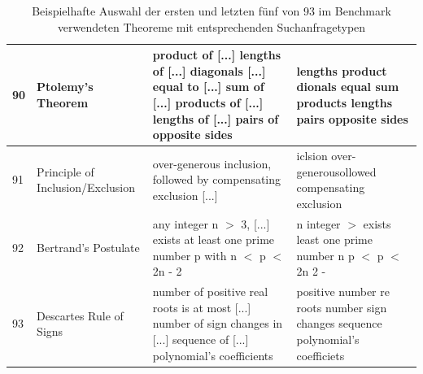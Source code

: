 \documentclass[12pt,letterpaper]{article} %
\begin{document}
\begin{table}[H]
\begin{tabularx}{\textwidth}{l>{\RaggedRight\arraybackslash}X>{\RaggedRight\arraybackslash}X>{\RaggedRight\arraybackslash}X}
\midrule

90 & Ptolemy's Theorem & product of [...] lengths of [...] diagonals [...] equal to [...] sum of [...] products of [...] lengths of [...] pairs of opposite sides\footnotemark[7] & lengths product dionals equal sum products lengths pairs opposite sides \\

\midrule

91 & Principle of Inclusion/Exclusion & [...] over-generous inclusion, followed by compensating exclusion [...]\footnotemark[8] & iclsion over-generousollowed compensating exclusion \\

\midrule

92 & Bertrand's Postulate & [...] any integer n $>$ 3, [...] exists at least one prime number p with n $<$ p $<$ 2n - 2\footnotemark[9] & n integer $>$ exists least one prime number n p $<$ p $<$ 2n 2 - \\

\midrule

93 & Descartes Rule of Signs & number of positive real roots is at most [...] number of sign changes in [...] sequence of [...] polynomial's coefficients\footnotemark[10] & positive number re roots number sign changes sequence polynomial's coefficiets \\
\bottomrule
\end{tabularx}
\caption{Beispielhafte Auswahl der ersten und letzten fünf von 93 im Benchmark verwendeten Theoreme mit entsprechenden Suchanfragetypen}
\label{tab:benchmark_beispiel}
\end{table}

\end{document}
